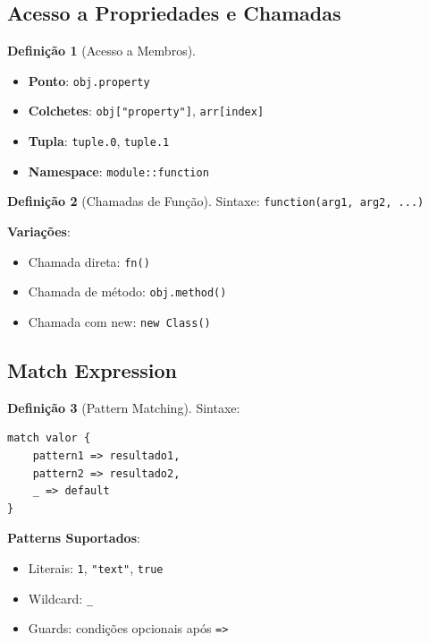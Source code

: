 \documentclass[12pt,a4paper]{article}
\theoremstyle{definition}
\newtheorem{definition}{Definição}[section]
\begin{document}
\subsection{Acesso a Propriedades e Chamadas}

\begin{definition}[Acesso a Membros]
\begin{itemize}
    \item \textbf{Ponto}: \texttt{obj.property}
    \item \textbf{Colchetes}: \texttt{obj["property"]}, \texttt{arr[index]}
    \item \textbf{Tupla}: \texttt{tuple.0}, \texttt{tuple.1}
    \item \textbf{Namespace}: \texttt{module::function}
\end{itemize}
\end{definition}

\begin{definition}[Chamadas de Função]
Sintaxe: \texttt{function(arg1, arg2, ...)}

\textbf{Variações}:
\begin{itemize}
    \item Chamada direta: \texttt{fn()}
    \item Chamada de método: \texttt{obj.method()}
    \item Chamada com new: \texttt{new Class()}
\end{itemize}
\end{definition}

\subsection{Match Expression}

\begin{definition}[Pattern Matching]
Sintaxe:
\begin{verbatim}
match valor {
    pattern1 => resultado1,
    pattern2 => resultado2,
    _ => default
}
\end{verbatim}

\textbf{Patterns Suportados}:
\begin{itemize}
    \item Literais: \texttt{1}, \texttt{"text"}, \texttt{true}
    \item Wildcard: \texttt{\_}
    \item Guards: condições opcionais após \texttt{=>}
\end{itemize}
\end{definition}
\end{document}
